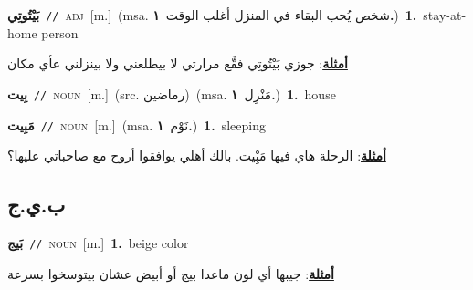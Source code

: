 \documentclass[10pt,a4paper,twoside]{article} %
\begin{document}
\begin{multicols}{2}
{\setlength\topsep{0pt}\textbf{\foreignlanguage{arabic}{بَيْتُوتِي}}\ {\color{gray}\texttt{//}\color{black}}\ \textsc{adj}\ [m.]\ \color{gray}(msa. \foreignlanguage{arabic}{شخص يُحب البقاء في المنزل أغلب الوقت}~\foreignlanguage{arabic}{\textbf{١.}})\color{black}\ \textbf{1.}~stay-at-home person\  \begin{flushright}\color{gray}\foreignlanguage{arabic}{\textbf{\underline{\foreignlanguage{arabic}{أمثلة}}}: جوزي بَيْتُوتِي فقَّع مرارتي لا بيطلعني ولا بينزلني عأي مكان}\end{flushright}\color{black}} \vspace{2mm}

{\setlength\topsep{0pt}\textbf{\foreignlanguage{arabic}{بِيت}}\ {\color{gray}\texttt{//}\color{black}}\ \textsc{noun}\ [m.]\ (src. \color{gray}\foreignlanguage{arabic}{رماضين}\color{black})\ \color{gray}(msa. \foreignlanguage{arabic}{مَنْزِل}~\foreignlanguage{arabic}{\textbf{١.}})\color{black}\ \textbf{1.}~house\ } \vspace{2mm}

{\setlength\topsep{0pt}\textbf{\foreignlanguage{arabic}{مَبِيت}}\ {\color{gray}\texttt{//}\color{black}}\ \textsc{noun}\ [m.]\ \color{gray}(msa. \foreignlanguage{arabic}{نَوْم}~\foreignlanguage{arabic}{\textbf{١.}})\color{black}\ \textbf{1.}~sleeping\  \begin{flushright}\color{gray}\foreignlanguage{arabic}{\textbf{\underline{\foreignlanguage{arabic}{أمثلة}}}: الرحلة هاي فيها مَبِْيت. بالك أهلي يوافقوا أروح مع صاحباتي عليها؟}\end{flushright}\color{black}} \vspace{2mm}

\vspace{-3mm}
\subsection*{\color{blue}\foreignlanguage{arabic}{ب.ي.ج}\color{blue}{}} 

{\setlength\topsep{0pt}\textbf{\foreignlanguage{arabic}{بَيج}}\ {\color{gray}\texttt{//}\color{black}}\ \textsc{noun}\ [m.]\ \textbf{1.}~beige color\  \begin{flushright}\color{gray}\foreignlanguage{arabic}{\textbf{\underline{\foreignlanguage{arabic}{أمثلة}}}: جيبها أي لون ماعدا بيج أو أبيض عشان بيتوسخوا بسرعة}\end{flushright}\color{black}} \vspace{2mm}


\end{multicols}
\end{document}
